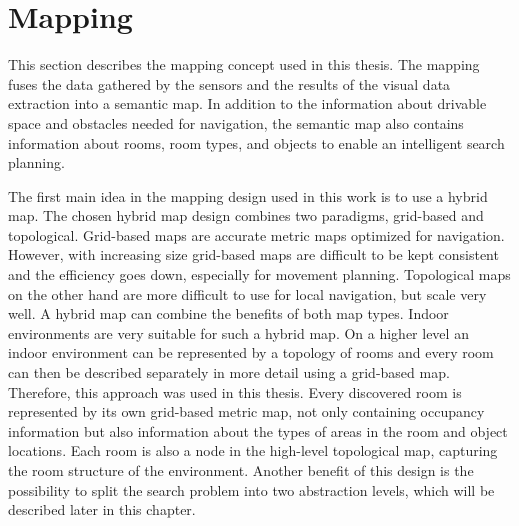 \section{Mapping} 

This section describes the mapping concept used in this thesis. The mapping fuses the data gathered by the sensors and the results of the visual data extraction into a semantic map. In addition to the information about drivable space and obstacles needed for navigation, the semantic map also contains information about rooms, room types, and objects to enable an intelligent search planning.  %

The first main idea in the mapping design used in this work is to use a hybrid map. The chosen hybrid map design combines two paradigms, grid-based and topological. Grid-based maps are accurate metric maps optimized for navigation. However, with increasing size grid-based maps are difficult to be kept consistent and the efficiency goes down, especially for movement planning. Topological maps on the other hand are more difficult to use for local navigation, but scale very well. A hybrid map can combine the benefits of both map types. Indoor environments are very suitable for such a hybrid map. On a higher level an indoor environment can be represented by a topology of rooms and every room can then be described separately in more detail using a grid-based map. Therefore, this approach was used in this thesis. Every discovered room is represented by its own grid-based metric map, not only containing occupancy information but also information about the types of areas in the room and object locations. Each room is also a node in the high-level topological map, capturing the room structure of the environment. Another benefit of this design is the possibility to split the search problem into two abstraction levels, which will be described later in this chapter.

